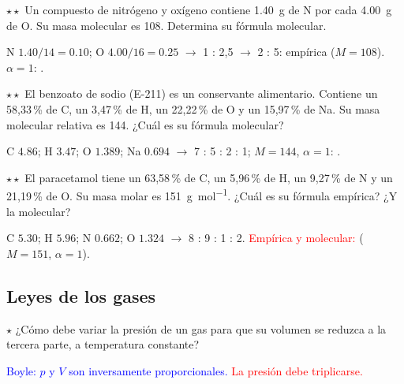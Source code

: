 \begin{exercise}
    \(\star\star\) Un compuesto de nitrógeno y oxígeno contiene \qty{1.40}{\gram} de N por cada \qty{4.00}{\gram} de O. Su masa
    molecular es 108. Determina su fórmula molecular.
    \begin{solu}
        N \(\num{1.40}/14 = \num{0.10}\); O \(\num{4.00}/16 = \num{0.25}\) \(\rightarrow\) 1 : 2,5 \(\rightarrow\) 2 : 5: empírica 
        (\(M = 108\)). \(\alpha = 1\): \textcolor{red}{}.
    \end{solu}
\end{exercise}

\begin{exercise}
    \(\star\star\) El benzoato de sodio (E-211) es un conservante alimentario. Contiene un 58,33\,\% de C, un 3,47\,\% de H, un
    22,22\,\% de O y un 15,97\,\% de Na. Su masa molecular relativa es 144. ¿Cuál es su fórmula molecular?
    \begin{solu}
        C \(\num{4.86}\); H \(\num{3.47}\); O \(\num{1.389}\); Na \(\num{0.694}\) \(\rightarrow\) 7 : 5 : 2 : 1; \(M = 144\), \(\alpha = 1\):
        \textcolor{red}{}.
    \end{solu}
\end{exercise}

\begin{exercise}
    \(\star\star\) El paracetamol tiene un 63,58\,\% de C, un 5,96\,\% de H, un 9,27\,\% de N y un 21,19\,\% de O. Su masa molar es
    \qty{151}{\gram\per\mole}. ¿Cuál es su fórmula empírica? ¿Y la molecular?
    \begin{solu}
        C \(\num{5.30}\); H \(\num{5.96}\); N \(\num{0.662}\); O \(\num{1.324}\) \(\rightarrow\) 8 : 9 : 1 : 2.
        \textcolor{red}{Empírica y molecular: } (\(M = 151\), \(\alpha = 1\)).
    \end{solu}
\end{exercise}

\subsection{Leyes de los gases}

\begin{exercise}
    \(\star\) ¿Cómo debe variar la presión de un gas para que su volumen se reduzca a la tercera parte, a temperatura constante?
    \begin{solu}
        \textcolor{blue}{Boyle: \(p\) y \(V\) son inversamente proporcionales.} \textcolor{red}{La presión debe triplicarse.}
    \end{solu}
\end{exercise}

